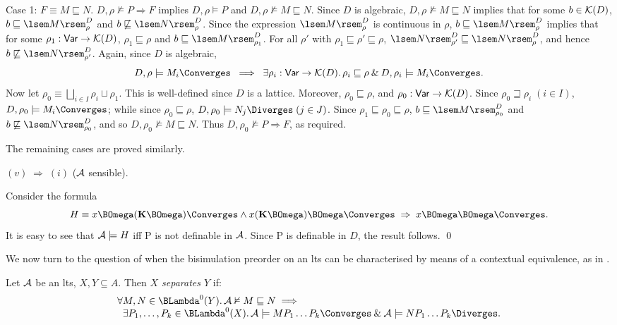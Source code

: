 Case 1: $F \equiv M \sqsubseteq N$. 
$D, \rho \nvDash P \Rightarrow F$ implies $D, \rho \models P$ and 
$D, \rho \nvDash M \sqsubseteq N$. Since $D$ is algebraic, 
$D, \rho \nvDash M \sqsubseteq N$ implies that for some $b \in {\cal K}(D)$, 
$b \sqsubseteq \lsem M \rsem^{D}_{\rho}$ and  $b \not\sqsubseteq \lsem N \rsem^{D}_{\rho}$. 
Since the expression  $\lsem M \rsem^{D}_{\rho}$ is continuous in $\rho$, 
$b \sqsubseteq \lsem M \rsem^{D}_{\rho}$ implies that for some 
$\rho_{1} : {\sf Var} \rightarrow {\cal K}(D)$, $\rho_{1} \sqsubseteq \rho$ 
and $b \sqsubseteq \lsem M \rsem^{D}_{\rho_{1}}$. 
For all $\rho'$ with $\rho_{1} \sqsubseteq \rho' \sqsubseteq \rho$, 
$\lsem N \rsem^{D}_{\rho'} \sqsubseteq \lsem N \rsem^{D}_{\rho}$, and hence 
$b \not\sqsubseteq \lsem N \rsem^{D}_{\rho'}$. 
Again, since $D$ is algebraic,
\[ D, \rho \models M_{i} \Converges \;\; \Longrightarrow \;\; \exists \rho_{i} : {\sf Var} \rightarrow {\cal K}(D) . \, \rho_{i} \sqsubseteq \rho \: \& \: D, \rho_{i} \models M_{i} \Converges . \]
Now let $\rho_{0} \equiv \bigsqcup_{i \in I}{\rho_{i} \sqcup \rho_{1}}$. 
This is well-defined since $D$ is a lattice. 
Moreover, $\rho_{0} \sqsubseteq \rho$, and $\rho_{0} : {\sf Var} \rightarrow {\cal K}(D)$. 
Since $\rho_{0} \sqsupseteq \rho_{i} \; (i \in I)$, $D, \rho_{0} \models M_{i} \Converges$; 
while since $\rho_{0} \sqsubseteq \rho$, $D, \rho_{0} \models N_{j} \Diverges \; (j \in J)$. 
Since $\rho_{1} \sqsubseteq \rho_{0} \sqsubseteq \rho$, 
$b \sqsubseteq \lsem M \rsem^{D}_{\rho_{0}}$ and  
$b \not\sqsubseteq \lsem N \rsem^{D}_{\rho_{0}}$, and so 
$D, \rho_{0} \nvDash M \sqsubseteq N$. 
Thus  $D, \rho_{0} \nvDash P \Rightarrow F$, as required.

The remaining cases are proved similarly.

\noindent $(v) \; \Longrightarrow \; (i)$ ($\cal A$ sensible).

Consider the formula
\[ H \equiv x \BOmega ({\bf K} \BOmega ) \Converges \wedge x ( {\bf K} \BOmega ) \BOmega \Converges \; \Rightarrow \; x \BOmega \BOmega \Converges . \]
It is easy to see that ${\cal A} \models H$ iff {\sf P} is not definable in $\cal A$. 
Since {\sf P} is definable in $D$, the result follows. \qed

We now turn to the question of when the bisimulation preorder on an lts can be characterised by means of a contextual equivalence, as in \cite{Bar,Plo77,Mil77}.

\begin{definition}
{\rm Let $\cal A$ be an lts, $X, Y \subseteq A$. Then {\em $X$ separates $Y$} if:}
\[ \begin{array}{l}
\forall M, N \in {\BLambda}^{0}(Y). \, {\cal A} \nvDash M \sqsubseteq N \; \Longrightarrow \\ 
\;\; \exists P_{1}, \ldots , P_{k} \in {\BLambda}^{0}(X) . \,
{\cal A} \models M P_{1} \ldots P_{k} \Converges \: \& \: {\cal A} \models N P_{1} \ldots P_{k} \Diverges . 
\end{array} \]
\end{definition}

